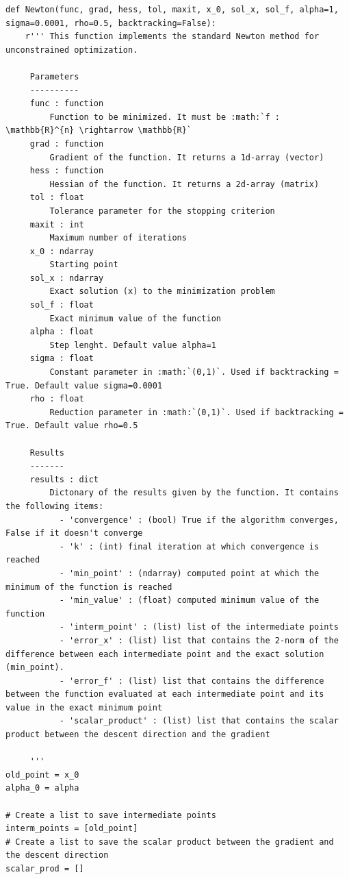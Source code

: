 \documentclass[a4paper,11pt]{article}
\begin{document}
\begin{verbatim}
def Newton(func, grad, hess, tol, maxit, x_0, sol_x, sol_f, alpha=1, sigma=0.0001, rho=0.5, backtracking=False):
    r''' This function implements the standard Newton method for unconstrained optimization.

     Parameters
     ----------
     func : function
         Function to be minimized. It must be :math:`f : \mathbb{R}^{n} \rightarrow \mathbb{R}`
     grad : function
         Gradient of the function. It returns a 1d-array (vector)
     hess : function
         Hessian of the function. It returns a 2d-array (matrix)
     tol : float
         Tolerance parameter for the stopping criterion
     maxit : int
         Maximum number of iterations
     x_0 : ndarray
         Starting point
     sol_x : ndarray
         Exact solution (x) to the minimization problem
     sol_f : float
         Exact minimum value of the function
     alpha : float
         Step lenght. Default value alpha=1
     sigma : float
         Constant parameter in :math:`(0,1)`. Used if backtracking = True. Default value sigma=0.0001
     rho : float
         Reduction parameter in :math:`(0,1)`. Used if backtracking = True. Default value rho=0.5

     Results
     -------
     results : dict
         Dictonary of the results given by the function. It contains the following items:
           - 'convergence' : (bool) True if the algorithm converges, False if it doesn't converge
           - 'k' : (int) final iteration at which convergence is reached
           - 'min_point' : (ndarray) computed point at which the minimum of the function is reached
           - 'min_value' : (float) computed minimum value of the function
           - 'interm_point' : (list) list of the intermediate points
           - 'error_x' : (list) list that contains the 2-norm of the difference between each intermediate point and the exact solution (min_point). 
           - 'error_f' : (list) list that contains the difference between the function evaluated at each intermediate point and its value in the exact minimum point
           - 'scalar_product' : (list) list that contains the scalar product between the descent direction and the gradient

     '''
old_point = x_0
alpha_0 = alpha

# Create a list to save intermediate points
interm_points = [old_point]
# Create a list to save the scalar product between the gradient and the descent direction
scalar_prod = []


\end{verbatim}
\end{document}
